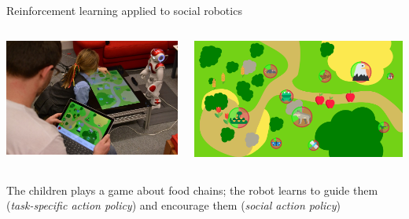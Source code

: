 \documentclass[compress,xcolor=table]{beamer}
\begin{document}
{

\begin{frame}{Reinforcement learning applied to social robotics}

    \begin{columns}
        \begin{column}{0.5\linewidth}

            \includegraphics[width=\linewidth]{sparc/overview}

        \end{column}
        \begin{column}{0.5\linewidth}
            \includegraphics[width=\linewidth]{sparc/gui}
        \end{column}
    \end{columns}

    The children plays a game about food chains; the robot learns to guide them
    (\emph{task-specific action policy}) and encourage them (\emph{social action
    policy})


\end{frame}}
\end{document}
